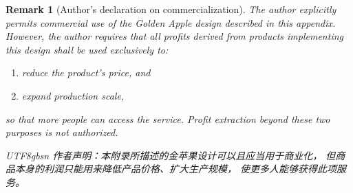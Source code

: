 \documentclass[11pt,a4paper]{article}
\newtheorem{remark}[theorem]{Remark}
\begin{document}
\begin{remark}[Author's declaration on commercialization]%
\label{rem:golden-apple-license}
The author explicitly permits commercial use of the Golden Apple
design described in this appendix.
However, the author requires that all profits derived from
products implementing this design shall be used exclusively to:
\begin{enumerate}
\item reduce the product's price, and
\item expand production scale,
\end{enumerate}
so that more people can access the service.
Profit extraction beyond these two purposes is not authorized.
\begin{CJK}{UTF8}{gbsn}
作者声明：本附录所描述的金苹果设计可以且应当用于商业化，
但商品本身的利润只能用来降低产品价格、扩大生产规模，
使更多人能够获得此项服务。
\end{CJK}
\end{remark}
\end{document}
